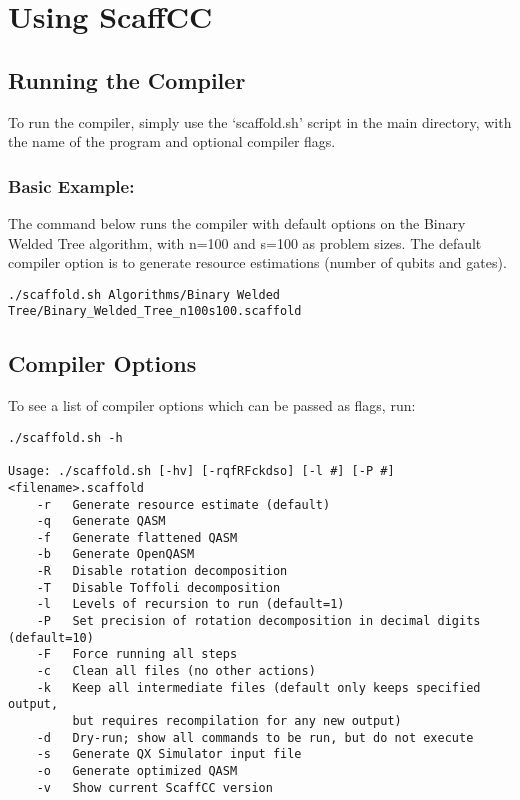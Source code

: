 \chapter{Using ScaffCC}\label{ch:usage}

\section{Running the Compiler}
To run the compiler, simply use the `scaffold.sh' script in the main directory, with the name of the program and optional compiler flags.

\subsection{Basic Example:}

The command below runs the compiler with default options on the Binary Welded Tree algorithm, with n=100 and s=100 as problem sizes.
The default compiler option is to generate resource estimations (number of qubits and gates).

\begin{lstlisting}
./scaffold.sh Algorithms/Binary Welded Tree/Binary_Welded_Tree_n100s100.scaffold
\end{lstlisting}


\section{Compiler Options}
To see a list of compiler options which can be passed as flags, run:

\begin{lstlisting}
./scaffold.sh -h

Usage: ./scaffold.sh [-hv] [-rqfRFckdso] [-l #] [-P #] <filename>.scaffold
    -r   Generate resource estimate (default)
    -q   Generate QASM
    -f   Generate flattened QASM
    -b   Generate OpenQASM
    -R   Disable rotation decomposition
    -T   Disable Toffoli decomposition
    -l   Levels of recursion to run (default=1)
    -P   Set precision of rotation decomposition in decimal digits (default=10)
    -F   Force running all steps
    -c   Clean all files (no other actions)
    -k   Keep all intermediate files (default only keeps specified output,
         but requires recompilation for any new output)
    -d   Dry-run; show all commands to be run, but do not execute
    -s   Generate QX Simulator input file 
    -o   Generate optimized QASM
    -v   Show current ScaffCC version
\end{lstlisting}



